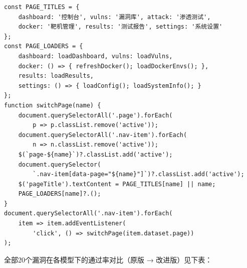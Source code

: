\begin{Verbatim}[mathescape=false]
const PAGE_TITLES = {
    dashboard: '控制台', vulns: '漏洞库', attack: '渗透测试',
    docker: '靶机管理', results: '测试报告', settings: '系统设置'
};
const PAGE_LOADERS = {
    dashboard: loadDashboard, vulns: loadVulns,
    docker: () => { refreshDocker(); loadDockerEnvs(); },
    results: loadResults,
    settings: () => { loadConfig(); loadSystemInfo(); }
};
function switchPage(name) {
    document.querySelectorAll('.page').forEach(
        p => p.classList.remove('active'));
    document.querySelectorAll('.nav-item').forEach(
        n => n.classList.remove('active'));
    $(`page-${name}`)?.classList.add('active');
    document.querySelector(
        `.nav-item[data-page="${name}"]`)?.classList.add('active');
    $('pageTitle').textContent = PAGE_TITLES[name] || name;
    PAGE_LOADERS[name]?.();
}
document.querySelectorAll('.nav-item').forEach(
    item => item.addEventListener(
        'click', () => switchPage(item.dataset.page))
);
\end{Verbatim}

\label{app:rawdata}

全部20个漏洞在各模型下的通过率对比（原版 → 改进版）见下表：

